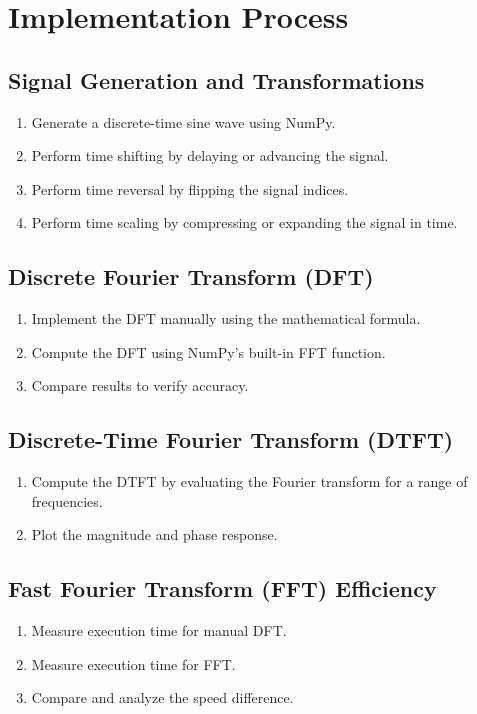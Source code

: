 \documentclass[a4paper,12pt]{article}
\begin{document}
\section*{Implementation Process}
\subsection*{Signal Generation and Transformations}
\begin{enumerate}
    \item Generate a discrete-time sine wave using NumPy.
    \item Perform time shifting by delaying or advancing the signal.
    \item Perform time reversal by flipping the signal indices.
    \item Perform time scaling by compressing or expanding the signal in time.
\end{enumerate}

\subsection*{Discrete Fourier Transform (DFT)}
\begin{enumerate}
    \item Implement the DFT manually using the mathematical formula.
    \item Compute the DFT using NumPy's built-in FFT function.
    \item Compare results to verify accuracy.
\end{enumerate}

\subsection*{Discrete-Time Fourier Transform (DTFT)}
\begin{enumerate}
    \item Compute the DTFT by evaluating the Fourier transform for a range of frequencies.
    \item Plot the magnitude and phase response.
\end{enumerate}

\subsection*{Fast Fourier Transform (FFT) Efficiency}
\begin{enumerate}
    \item Measure execution time for manual DFT.
    \item Measure execution time for FFT.
    \item Compare and analyze the speed difference.
\end{enumerate}
\end{document}
